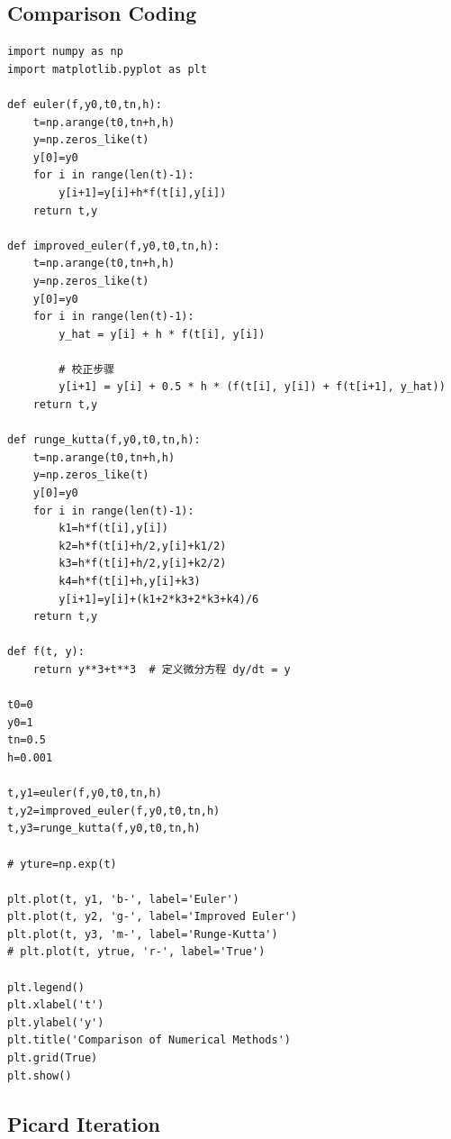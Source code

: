 \documentclass{article}
\begin{document}
\subsection{Comparison Coding}

\begin{verbatim}
import numpy as np
import matplotlib.pyplot as plt

def euler(f,y0,t0,tn,h):
    t=np.arange(t0,tn+h,h)
    y=np.zeros_like(t)
    y[0]=y0
    for i in range(len(t)-1):
        y[i+1]=y[i]+h*f(t[i],y[i])
    return t,y

def improved_euler(f,y0,t0,tn,h):
    t=np.arange(t0,tn+h,h)
    y=np.zeros_like(t)
    y[0]=y0
    for i in range(len(t)-1):
        y_hat = y[i] + h * f(t[i], y[i])
        
        # 校正步骤
        y[i+1] = y[i] + 0.5 * h * (f(t[i], y[i]) + f(t[i+1], y_hat))
    return t,y

def runge_kutta(f,y0,t0,tn,h):
    t=np.arange(t0,tn+h,h)
    y=np.zeros_like(t)
    y[0]=y0
    for i in range(len(t)-1):
        k1=h*f(t[i],y[i])
        k2=h*f(t[i]+h/2,y[i]+k1/2)
        k3=h*f(t[i]+h/2,y[i]+k2/2)
        k4=h*f(t[i]+h,y[i]+k3)
        y[i+1]=y[i]+(k1+2*k3+2*k3+k4)/6
    return t,y   

def f(t, y):
    return y**3+t**3  # 定义微分方程 dy/dt = y

t0=0
y0=1
tn=0.5
h=0.001

t,y1=euler(f,y0,t0,tn,h)
t,y2=improved_euler(f,y0,t0,tn,h)
t,y3=runge_kutta(f,y0,t0,tn,h)

# yture=np.exp(t)

plt.plot(t, y1, 'b-', label='Euler')
plt.plot(t, y2, 'g-', label='Improved Euler')
plt.plot(t, y3, 'm-', label='Runge-Kutta')
# plt.plot(t, ytrue, 'r-', label='True')

plt.legend()
plt.xlabel('t')
plt.ylabel('y')
plt.title('Comparison of Numerical Methods')
plt.grid(True)
plt.show()

\end{verbatim}



\subsection{Picard Iteration}
\end{document}
